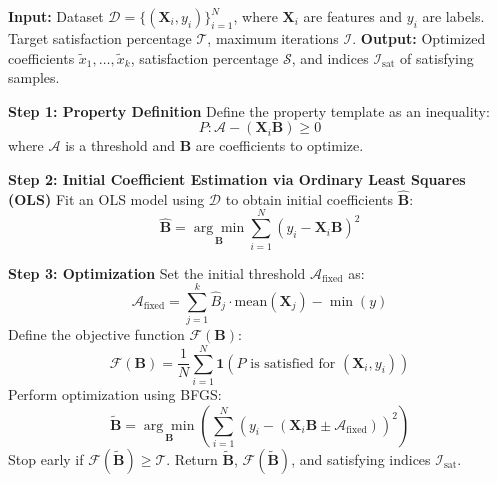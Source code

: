 \begin{algorithm}[htbp]
   
    \caption{Property-Based Training with Convex Optimization (Part 1: Initialization and Optimization)}
    \begin{algorithmic}[1]
    \State \textbf{Input:} Dataset $\mathcal{D} = \{(\mathbf{X}_i, y_i)\}_{i=1}^N$, where $\mathbf{X}_i$ are features and $y_i$ are labels. Target satisfaction percentage $\mathcal{T}$, maximum iterations $\mathcal{I}$.
    \State \textbf{Output:} Optimized coefficients $\tilde{x}_1, \dots, \tilde{x}_k$, satisfaction percentage $\mathcal{S}$, and indices $\mathcal{I}_{\text{sat}}$ of satisfying samples.
    
    \State \textbf{Step 1: Property Definition}
    \State Define the property template as an inequality:
    \[
    P: \mathcal{A} - (\mathbf{X}_i \mathbf{B}) \geq 0
    \]
    where $\mathcal{A}$ is a threshold and $\mathbf{B}$ are coefficients to optimize.
    
    \State \textbf{Step 2: Initial Coefficient Estimation via Ordinary Least Squares (OLS)}
    \State Fit an OLS model using $\mathcal{D}$ to obtain initial coefficients $\hat{\mathbf{B}}$:
    \[
    \hat{\mathbf{B}} = \underset{\mathbf{B}}{\arg\min} \sum_{i=1}^N \left( y_i - \mathbf{X}_i \mathbf{B} \right)^2
    \]
    
    \State \textbf{Step 3: Optimization}
    \State Set the initial threshold $\mathcal{A}_{\text{fixed}}$ as:
    \[
    \mathcal{A}_{\text{fixed}} = \sum_{j=1}^k \hat{B}_j \cdot \text{mean}(\mathbf{X}_j) - \min(y)
    \]
    \State Define the objective function $\mathcal{F}(\mathbf{B})$:
    \[
    \mathcal{F}(\mathbf{B}) = \frac{1}{N} \sum_{i=1}^N \mathbf{1}\left(P \text{ is satisfied for } (\mathbf{X}_i, y_i)\right)
    \]
    \State Perform optimization using BFGS:
    \[
    \tilde{\mathbf{B}} = \underset{\mathbf{B}}{\arg\min} \left(\sum_{i=1}^N \left(y_i - (\mathbf{X}_i \mathbf{B} \pm \mathcal{A}_{\text{fixed}})\right)^2 \right)
    \]
    Stop early if $\mathcal{F}(\tilde{\mathbf{B}}) \geq \mathcal{T}$.
    \State Return $\tilde{\mathbf{B}}$, $\mathcal{F}(\tilde{\mathbf{B}})$, and satisfying indices $\mathcal{I}_{\text{sat}}$.
    \end{algorithmic}
    \label{alg:compositional_training}
\end{algorithm}



